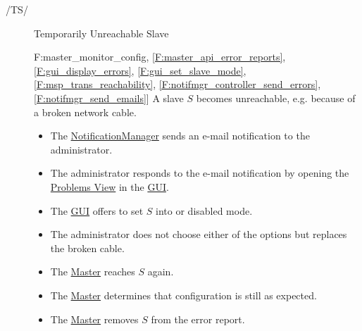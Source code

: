 \documentclass[a4paper, 11pt]{article}
\makeatletter
\def\namedlabel#1#2{\begingroup
    #2%
    \def\@currentlabel{#2}%
    \phantomsection\label{#1}\endgroup
}
\newcommand{\oitem}[2]{
  \@ifundefined{c@oitem#1}{\newcounter{oitem#1}}{} %
  \addtocounter{oitem#1}{10}
  \item[\namedlabel{#1:#2}{/#1\arabic{oitem#1}/}]
}
\newcommand{\testsequence}[3][]{
	\begin{description}[leftmargin=!,labelwidth=\widthof{\bfseries Preconditions}]
		\ifthenelse{\equal{#1}{}}
		{} %
		{\item[Tests] #1}
		\item[Preconditions] #2
		\item[Steps] #3
	\end{description}
}
\makeatother
\begin{document}
\begin{description}
\oitem{TS}{} Temporarily Unreachable Slave
\testsequence
[\ref{F:master_monitor_config}, \ref{F:master_api_error_reports}, \ref{F:gui_display_errors}, \ref{F:gui_set_slave_mode}, \ref{F:msp_trans_reachability}, \ref{F:notifmgr_controller_send_errors}, \ref{F:notifmgr_send_emails}]
{
	A \gls{slave} $S$ becomes unreachable, e.g. because of a broken network cable.
}
{
	\begin{itemize}
		\item The \hyperref[SM:NotificationManager]{NotificationManager} sends an e-mail notification to the \gls{administrator}.
		\item The \gls{administrator} responds to the e-mail notification by opening the \hyperref[subsec:ui:problems_view]{Problems View} in the \hyperref[SM:GUI]{GUI}.
		\item The \hyperref[SM:GUI]{GUI} offers to set $S$ into  or \gls{disabled mode}.
		\item The \gls{administrator} does not choose either of the options but replaces the broken cable.
		\item The \hyperref[SM:Master]{Master} reaches $S$ again.
		\item The \hyperref[SM:Master]{Master} determines that configuration is still as expected.
		\item The \hyperref[SM:Master]{Master} removes $S$ from the error report.
	\end{itemize}
}



\end{description}
\end{document}
